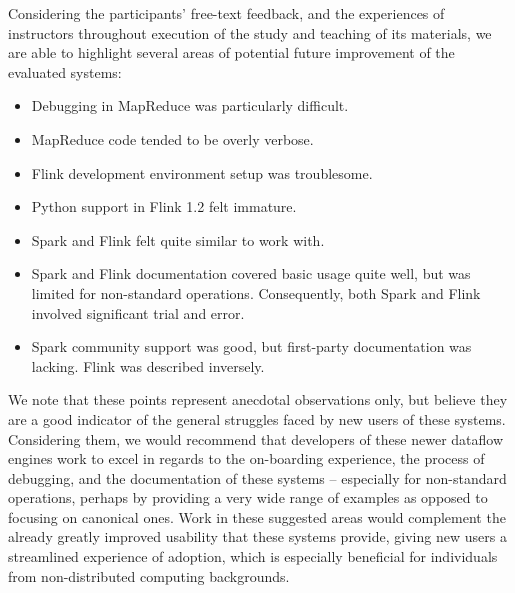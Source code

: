   Considering the participants' free-text feedback, and the experiences of instructors throughout execution of the study and teaching of its materials, we are able to highlight several areas of potential future improvement of the evaluated systems:
  
  \begin{itemize}
    \item Debugging in MapReduce was particularly difficult.
    \item MapReduce code tended to be overly verbose.
    \item Flink development environment setup was troublesome.
    \item Python support in Flink 1.2 felt immature.
    \item Spark and Flink felt quite similar to work with.
    \item Spark and Flink documentation covered basic usage quite well, but was limited for non-standard operations. Consequently, both Spark and Flink involved significant trial and error.
    \item Spark community support was good, but first-party documentation was lacking. Flink was described inversely.
  \end{itemize}
  
  We note that these points represent anecdotal observations only, but believe they are a good indicator of the general struggles faced by new users of these systems. Considering them, we would recommend that developers of these newer dataflow engines work to excel in regards to the on-boarding experience, the process of debugging, and the documentation of these systems -- especially for non-standard operations, perhaps by providing a very wide range of examples as opposed to focusing on canonical ones. Work in these suggested areas would complement the already greatly improved usability that  these systems provide, giving new users a streamlined experience of adoption, which is especially beneficial for individuals from non-distributed computing backgrounds.